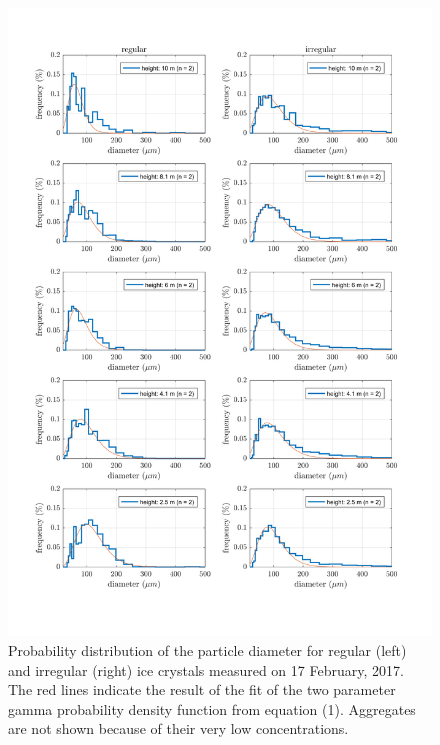 \documentclass[draft,linenumbers]{agujournal}
\begin{document}
\begin{figure}[t]
 \centering
 	\includegraphics[width=14cm]{gammaPDF.png}
 \caption{Probability distribution of the particle diameter for regular (left) and irregular (right) ice crystals measured on 17 February, 2017. The red lines indicate the result of the fit of the two parameter gamma probability density function from equation (1). Aggregates are not shown because of their very low concentrations.}
 \label{fig:gammaPDF}
\end{figure}
\end{document}
